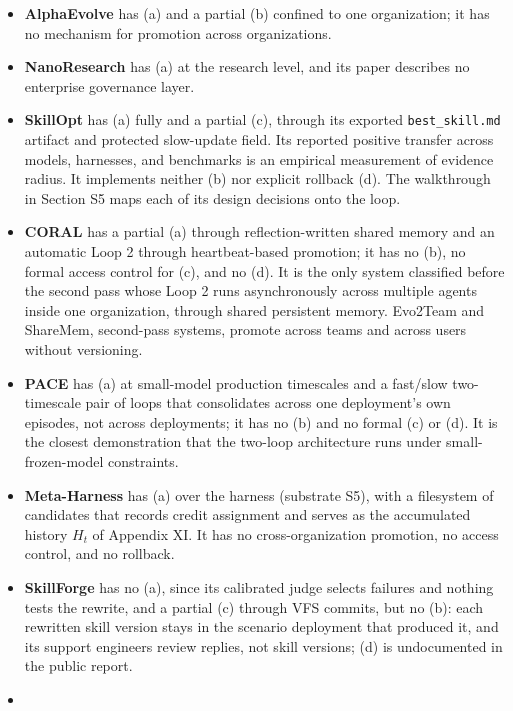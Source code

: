 \documentclass[
]{article}
\providecommand{\tightlist}{%
  \setlength{\itemsep}{0pt}\setlength{\parskip}{0pt}}
\begin{document}
\begin{itemize}
\tightlist
\item
  \textbf{AlphaEvolve} has (a) and a partial (b) confined to one
  organization; it has no mechanism for promotion across organizations.
\item
  \textbf{NanoResearch} has (a) at the research level, and its paper
  describes no enterprise governance layer.
\item
  \textbf{SkillOpt} has (a) fully and a partial (c), through its
  exported \texttt{best\_skill.md} artifact and protected slow-update
  field. Its reported positive transfer across models, harnesses, and
  benchmarks is an empirical measurement of evidence radius. It
  implements neither (b) nor explicit rollback (d). The walkthrough in
  Section S5 maps each of its design decisions onto the loop.
\item
  \textbf{CORAL} \cite{qu2026coral} has a partial (a) through
  reflection-written shared memory and an automatic Loop 2 through
  heartbeat-based promotion; it has no (b), no formal access control for
  (c), and no (d). It is the only system classified before the second
  pass whose Loop 2 runs asynchronously across multiple agents inside
  one organization, through shared persistent memory. Evo2Team and
  ShareMem, second-pass systems, promote across teams and across users
  without versioning.
\item
  \textbf{PACE} \cite{ling2026pace} has (a) at small-model production
  timescales and a fast/slow two-timescale pair of loops that
  consolidates across one deployment's own episodes, not across
  deployments; it has no (b) and no formal (c) or (d). It is the closest
  demonstration that the two-loop architecture runs under
  small-frozen-model constraints.
\item
  \textbf{Meta-Harness} \cite{lee2026metaharness} has (a) over the
  harness (substrate S5), with a filesystem of candidates that records
  credit assignment and serves as the accumulated history \(H_t\) of
  Appendix XI. It has no cross-organization promotion, no access
  control, and no rollback.
\item
  \textbf{SkillForge} has no (a), since its calibrated judge selects
  failures and nothing tests the rewrite, and a partial (c) through VFS
  commits, but no (b): each rewritten skill version stays in the
  scenario deployment that produced it, and its support engineers review
  replies, not skill versions; (d) is undocumented in the public report.
\item

\end{itemize}
\end{document}
